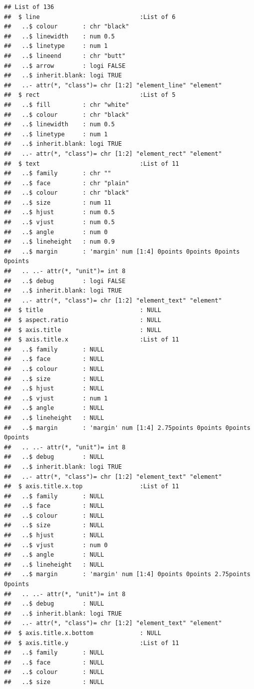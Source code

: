 \documentclass[
  12pt,
]{article}
\begin{document}
\begin{verbatim}
## List of 136
##  $ line                            :List of 6
##   ..$ colour       : chr "black"
##   ..$ linewidth    : num 0.5
##   ..$ linetype     : num 1
##   ..$ lineend      : chr "butt"
##   ..$ arrow        : logi FALSE
##   ..$ inherit.blank: logi TRUE
##   ..- attr(*, "class")= chr [1:2] "element_line" "element"
##  $ rect                            :List of 5
##   ..$ fill         : chr "white"
##   ..$ colour       : chr "black"
##   ..$ linewidth    : num 0.5
##   ..$ linetype     : num 1
##   ..$ inherit.blank: logi TRUE
##   ..- attr(*, "class")= chr [1:2] "element_rect" "element"
##  $ text                            :List of 11
##   ..$ family       : chr ""
##   ..$ face         : chr "plain"
##   ..$ colour       : chr "black"
##   ..$ size         : num 11
##   ..$ hjust        : num 0.5
##   ..$ vjust        : num 0.5
##   ..$ angle        : num 0
##   ..$ lineheight   : num 0.9
##   ..$ margin       : 'margin' num [1:4] 0points 0points 0points 0points
##   .. ..- attr(*, "unit")= int 8
##   ..$ debug        : logi FALSE
##   ..$ inherit.blank: logi TRUE
##   ..- attr(*, "class")= chr [1:2] "element_text" "element"
##  $ title                           : NULL
##  $ aspect.ratio                    : NULL
##  $ axis.title                      : NULL
##  $ axis.title.x                    :List of 11
##   ..$ family       : NULL
##   ..$ face         : NULL
##   ..$ colour       : NULL
##   ..$ size         : NULL
##   ..$ hjust        : NULL
##   ..$ vjust        : num 1
##   ..$ angle        : NULL
##   ..$ lineheight   : NULL
##   ..$ margin       : 'margin' num [1:4] 2.75points 0points 0points 0points
##   .. ..- attr(*, "unit")= int 8
##   ..$ debug        : NULL
##   ..$ inherit.blank: logi TRUE
##   ..- attr(*, "class")= chr [1:2] "element_text" "element"
##  $ axis.title.x.top                :List of 11
##   ..$ family       : NULL
##   ..$ face         : NULL
##   ..$ colour       : NULL
##   ..$ size         : NULL
##   ..$ hjust        : NULL
##   ..$ vjust        : num 0
##   ..$ angle        : NULL
##   ..$ lineheight   : NULL
##   ..$ margin       : 'margin' num [1:4] 0points 0points 2.75points 0points
##   .. ..- attr(*, "unit")= int 8
##   ..$ debug        : NULL
##   ..$ inherit.blank: logi TRUE
##   ..- attr(*, "class")= chr [1:2] "element_text" "element"
##  $ axis.title.x.bottom             : NULL
##  $ axis.title.y                    :List of 11
##   ..$ family       : NULL
##   ..$ face         : NULL
##   ..$ colour       : NULL
##   ..$ size         : NULL

\end{verbatim}
\end{document}
